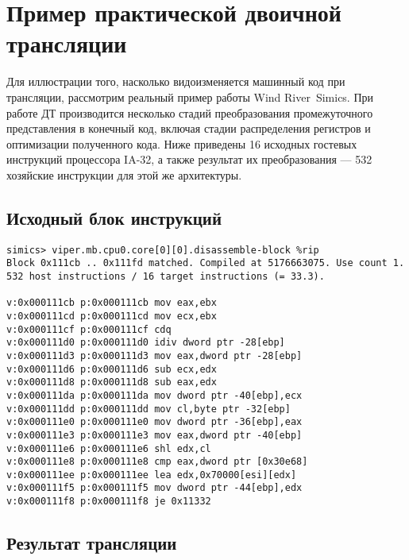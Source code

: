 \section[Пример практической двоичной трансляции]{Пример практической двоичной трансляции}

Для иллюстрации того, насколько видоизменяется машинный код при трансляции, рассмотрим реальный пример работы Wind River\textregistered~Simics. При работе ДТ производится несколько стадий преобразования промежуточного представления в конечный код, включая стадии распределения регистров и оптимизации полученного кода. Ниже приведены 16 исходных гостевых инструкций процессора IA-32, а также результат их преобразования --- 532 хозяйские инструкции для этой же архитектуры.

\subsection{Исходный блок инструкций}

\begin{lstlisting}
simics> viper.mb.cpu0.core[0][0].disassemble-block %rip
Block 0x111cb .. 0x111fd matched. Compiled at 5176663075. Use count 1.
532 host instructions / 16 target instructions (= 33.3).

v:0x000111cb p:0x000111cb mov eax,ebx
v:0x000111cd p:0x000111cd mov ecx,ebx
v:0x000111cf p:0x000111cf cdq
v:0x000111d0 p:0x000111d0 idiv dword ptr -28[ebp]
v:0x000111d3 p:0x000111d3 mov eax,dword ptr -28[ebp]
v:0x000111d6 p:0x000111d6 sub ecx,edx
v:0x000111d8 p:0x000111d8 sub eax,edx
v:0x000111da p:0x000111da mov dword ptr -40[ebp],ecx
v:0x000111dd p:0x000111dd mov cl,byte ptr -32[ebp]
v:0x000111e0 p:0x000111e0 mov dword ptr -36[ebp],eax
v:0x000111e3 p:0x000111e3 mov eax,dword ptr -40[ebp]
v:0x000111e6 p:0x000111e6 shl edx,cl
v:0x000111e8 p:0x000111e8 cmp eax,dword ptr [0x30e68]
v:0x000111ee p:0x000111ee lea edx,0x70000[esi][edx]
v:0x000111f5 p:0x000111f5 mov dword ptr -44[ebp],edx
v:0x000111f8 p:0x000111f8 je 0x11332
\end{lstlisting}

\subsection{Результат трансляции}

